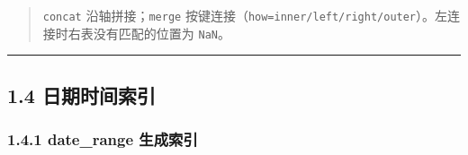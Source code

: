 \begin{Shaded}
\begin{Highlighting}[]
\end{Highlighting}
\end{Shaded}

\begin{quote}
\texttt{concat} 沿轴拼接；\texttt{merge}
按键连接（\texttt{how=\textquotesingle{}inner\textquotesingle{}/\textquotesingle{}left\textquotesingle{}/\textquotesingle{}right\textquotesingle{}/\textquotesingle{}outer\textquotesingle{}}）。左连接时右表没有匹配的位置为
\texttt{NaN}。
\end{quote}

\begin{center}\rule{0.5\linewidth}{0.5pt}\end{center}

\subsection{1.4
日期时间索引}\label{ux65e5ux671fux65f6ux95f4ux7d22ux5f15}

\subsubsection{1.4.1 date\_range
生成索引}\label{date_range-ux751fux6210ux7d22ux5f15}

\begin{Shaded}
\begin{Highlighting}[]
\OperatorTok{=}\OperatorTok{=}\OperatorTok{=}\NormalTok{)}

\OperatorTok{=}\OperatorTok{=}\OperatorTok{=}\OperatorTok{=}\NormalTok{)}
\NormalTok{(hr\_dr[:}\NormalTok{])}

\OperatorTok{=}\OperatorTok{=}\OperatorTok{=}\OperatorTok{=}\OperatorTok{=}\NormalTok{)}
\end{Highlighting}
\end{Shaded}

